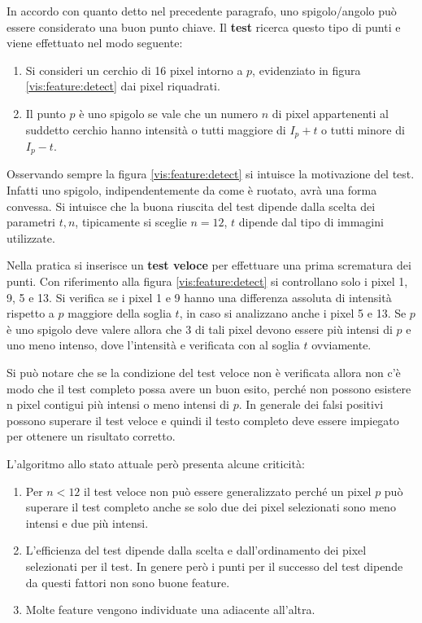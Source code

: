  
In accordo con quanto detto nel precedente paragrafo, uno spigolo/angolo può essere considerato una buon punto chiave. Il \textbf{test} ricerca questo tipo di punti e viene effettuato nel modo seguente:
\begin{enumerate}
	\item Si consideri un cerchio di 16 pixel intorno a $p$, evidenziato in figura \ref{vis:feature:detect} dai pixel riquadrati.
	\item Il punto $p$ è uno spigolo se vale che un numero $n$ di pixel appartenenti al suddetto cerchio hanno intensità o tutti maggiore di $I_p + t$ o tutti minore di $I_p - t$.
\end{enumerate}

Osservando sempre la figura \ref{vis:feature:detect} si intuisce la motivazione del test. Infatti uno spigolo, indipendentemente da come è ruotato, avrà una forma convessa. Si intuisce che la buona riuscita del test dipende dalla scelta dei parametri $t, n$, tipicamente si sceglie $n = 12$, $t$ dipende dal tipo di immagini utilizzate.

	Nella pratica si inserisce un \textbf{test veloce} per effettuare una prima scrematura dei punti. Con riferimento alla figura \ref{vis:feature:detect} si controllano solo i pixel 1, 9, 5 e 13. Si verifica se i pixel 1 e 9 hanno una differenza assoluta di intensità rispetto a $p$ maggiore della soglia $t$, in caso si analizzano anche i pixel 5 e 13. Se $p$ è uno spigolo deve valere allora che 3 di tali pixel devono essere più intensi di $p$ e uno meno intenso, dove l'intensità e verificata con al soglia $t$ ovviamente.

Si può notare che se la condizione del test veloce non è verificata allora non c'è modo che il test completo possa avere un buon esito, perché non possono esistere n pixel contigui più intensi o meno intensi di $p$. In generale dei falsi positivi possono superare il test veloce e quindi il testo completo deve essere impiegato per ottenere un risultato corretto.

L'algoritmo allo stato attuale però presenta alcune criticità:
\begin{enumerate}
	\item Per $n < 12$ il test veloce non può essere generalizzato perché un pixel $p$ può superare il test completo anche se solo due dei pixel selezionati sono meno intensi e due più intensi.
	\item L'efficienza del test dipende dalla scelta e dall'ordinamento dei pixel selezionati per il test. In genere però i punti per il successo del test dipende da questi fattori non sono buone feature. 
	\item Molte feature vengono individuate una adiacente all'altra.
\end{enumerate} 


